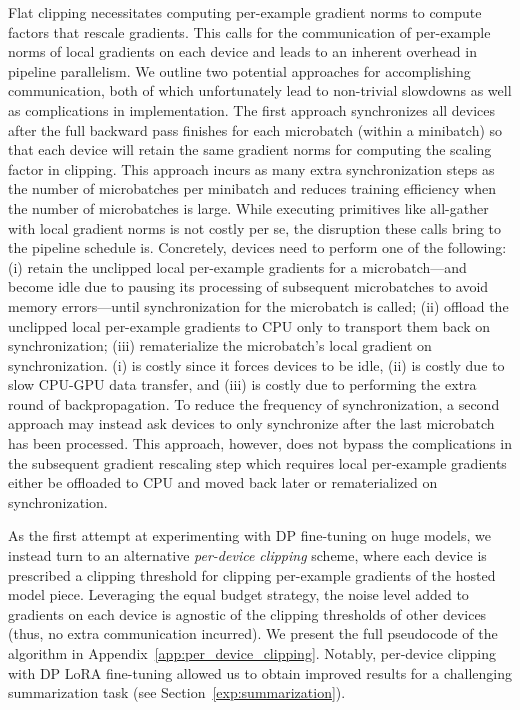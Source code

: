Flat clipping necessitates computing per-example gradient norms to compute factors that rescale gradients. 
This calls for the communication of per-example norms of local gradients on each device and leads to an inherent overhead in pipeline parallelism. 
We outline two potential approaches for accomplishing communication, both of which unfortunately lead to non-trivial slowdowns as well as complications in implementation.
The first approach synchronizes all devices after the full backward pass finishes for each microbatch (within a minibatch) so that each device will retain the same gradient norms for computing the scaling factor in clipping.
This approach incurs as many extra synchronization steps as the number of microbatches per minibatch and reduces training efficiency when the number of microbatches is large.
While executing primitives like all-gather with local gradient norms is not costly per se, the disruption these calls bring to the pipeline schedule is. 
Concretely, devices need to perform one of the following: (i) retain the unclipped local per-example gradients for a microbatch---and become idle due to pausing its processing of subsequent microbatches to avoid memory errors---until synchronization for the microbatch is called; (ii) offload the unclipped local per-example gradients to CPU only to transport them back on synchronization; (iii) rematerialize the microbatch's local gradient on synchronization. 
(i) is costly since it forces devices to be idle, (ii) is costly due to slow CPU-GPU data transfer, and (iii) is costly due to performing the extra round of backpropagation. 
To reduce the frequency of synchronization, a second approach may instead ask devices to only synchronize after the last microbatch has been processed. 
This approach, however, does not bypass the complications in the subsequent gradient rescaling step which requires local per-example gradients either be offloaded to CPU and moved back later or rematerialized on synchronization.





As the first attempt at experimenting with DP fine-tuning on huge models, we instead turn to an alternative \emph{per-device clipping} scheme, where each device is prescribed a clipping threshold for clipping per-example gradients of the hosted model piece.
Leveraging the equal budget strategy, the noise level added to gradients on each device is agnostic of the clipping thresholds of other devices (thus, no extra communication incurred). 
We present the full pseudocode of the algorithm in Appendix~\ref{app:per_device_clipping}. 
Notably, per-device clipping with DP LoRA fine-tuning allowed us to obtain improved results for a challenging summarization task (see Section~\ref{exp:summarization}). 



